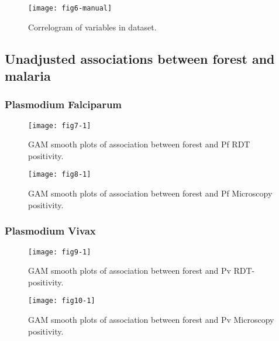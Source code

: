 \documentclass{article}\usepackage[]{graphicx}\usepackage[]{color}
\begin{document}
\begin{figure}[hbp]
\begin{center}
\texttt{[image: fig6-manual]}
\end{center}
\caption{Correlogram of variables in dataset.}
\label{fig:Correlogram_Covariates}
\end{figure}

\newpage
\subsection{Unadjusted associations between forest and malaria}
\subsubsection{Plasmodium Falciparum}


\begin{figure}[hbp]
\begin{center}

\texttt{[image: fig7-1]}
\end{center}
\caption{GAM smooth plots of association between forest and Pf RDT positivity.}
\label{fig:Smooth_Pf_RDT}
\end{figure}


\begin{figure}[hbp]
\begin{center}

\texttt{[image: fig8-1]}
\end{center}
\caption{GAM smooth plots of association between forest and Pf Microscopy positivity.}
\label{fig:Smooth_Pf_Microscopy}
\end{figure}

\newpage

\subsubsection{Plasmodium Vivax}


\begin{figure}[hbp]
\begin{center}

\texttt{[image: fig9-1]}
\end{center}
\caption{GAM smooth plots of association between forest and Pv RDT-positivity.}
\label{fig:Smooth_Pv_RDT}
\end{figure}


\begin{figure}[hbp]
\begin{center}

\texttt{[image: fig10-1]}
\end{center}
\caption{GAM smooth plots of association between forest and Pv Microscopy positivity.}
\label{fig:Smooth_Pv_Microscopy}
\end{figure}
\end{document}
